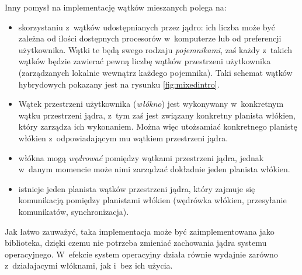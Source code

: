 \documentclass[11pt,makeidx]{mwart}
\begin{document}
	Inny pomysł na implementację wątków mieszanych polega na:
	\begin{itemize}
		\item skorzystaniu z~wątków udostępnianych przez jądro: ich liczba może być zależna od ilości dostępnych procesorów w~komputerze
			lub od preferencji użytkownika. Wątki te będą swego rodzaju \emph{pojemnikami}, zaś każdy z~takich wątków będzie zawierać pewną
			liczbę wątków przestrzeni użytkownika (zarządzanych lokalnie wewnątrz każdego pojemnika). Taki schemat wątków hybrydowych pokazany jest na
			rysunku \ref{fig:mixedintro}.
		\item Wątek przestrzeni użytkownika (\emph{włókno}) jest wykonywany w~konkretnym wątku przestrzeni jądra, z~tym zaś jest związany
			konkretny planista włókien, który zarządza ich wykonaniem. Można więc utożsamiać konkretnego planistę włókien z~odpowiadającym mu
			wątkiem przestrzeni jądra.
		\item włókna mogą \emph{wędrować} pomiędzy wątkami przestrzeni jądra, jednak w~danym momencie może nimi zarządzać dokładnie jeden
			planista włókien.
		\item istnieje jeden planista wątków przestrzeni jądra, który zajmuje się komunikacją pomiędzy planistami włókien (wędrówka włókien,
			przesyłanie komunikatów, synchronizacja).
	\end{itemize}
	Jak łatwo zauważyć, taka implementacja może być zaimplementowana jako biblioteka, dzięki czemu nie potrzeba zmieniać zachowania jądra systemu operacyjnego.
  W~efekcie system operacyjny działa równie wydajnie zarówno z~działajacymi włóknami, jak i~bez ich użycia.
\par
%
\end{document}
